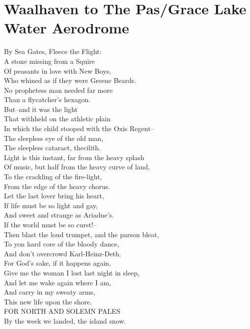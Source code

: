\documentclass[smalldemyvopaper,11pt,twoside,onecolumn,openright,extrafontsizes]{memoir}
\begin{document}
\chapter{Waalhaven to The Pas/Grace Lake Water Aerodrome}
By Sea Gates, Fleece the Flight:
\\A stone missing from a Squire
\\Of peasants in love with New Boys,
\\Who whined as if they were Greene Beards.
\\No prophetess man needed far more
\\Than a flycatcher's hexagon.
\\But--and it was the light
\\That withheld on the athletic plain
\\In which the child stooped with the Oxis Regent--
\\The sleepless eye of the old man,
\\The sleepless cataract, thecilith.
\\Light is this instant, far from the heavy splash
\\Of music, but half from the heavy curve of land,
\\To the crackling of the fire-light,
\\From the edge of the heavy chorus.
\\Let the last lover bring his heart,
\\If life must be so light and gay,
\\And sweet and strange as Ariadne's.
\\If the world must be so curst!--
\\Then blast the loud trumpet, and the parson bleat,
\\To yon hard core of the bloody dance,
\\And don't overcrowd Karl-Heinz-Deth.
\\For God's sake, if it happens again,
\\Give me the woman I lost last night in sleep,
\\And let me wake again where I am,
\\And carry in my sweaty arms,
\\This new life upon the shore.
\\FOR NORTH AND SOLEMN PALES
\\By the week we landed, the island snow.
\end{document}
